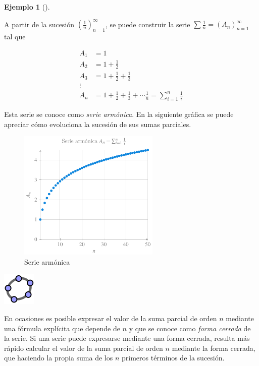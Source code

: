 \documentclass[
  a4paper,
]{scrreport}
\theoremstyle{definition}
\newtheorem{example}{Ejemplo}[chapter]
\theoremstyle{plain}
\theoremstyle{definition}
\theoremstyle{definition}
\theoremstyle{plain}
\theoremstyle{plain}
\theoremstyle{remark}
\begin{document}
\begin{example}[]\protect\hypertarget{exm-serie}{}\label{exm-serie}

A partir de la sucesión \(\left(\frac{1}{n}\right)_{n=1}^\infty\), se
puede construir la serie \(\sum \frac{1}{n}=(A_n)_{n=1}^\infty\) tal que

\begin{align*}
A_1 &= 1\\ 
A_2 &= 1+\frac{1}{2}\\ 
A_3 &= 1+\frac{1}{2}+\frac{1}{3}\\ 
\vdots\\ 
A_n &= 1+\frac{1}{2}+\frac{1}{3}+\cdots \frac{1}{n} = \sum_{i=1}^n\frac{1}{i} 
\end{align*}

Esta serie se conoce como \emph{serie armónica}. En la siguiente gráfica
se puede apreciar cómo evoluciona la sucesión de sus sumas parciales.

\begin{figure}[H]

{\centering \includegraphics[width=0.6\textwidth,height=\textheight]{img/series/serie-armonica.pdf}

}

\caption{Serie armónica}

\end{figure}%

\includegraphics{img/logos/logo-geogebra.png}

\end{example}

En ocasiones es posible expresar el valor de la suma parcial de orden
\(n\) mediante una fórmula explícita que depende de \(n\) y que se
conoce como \emph{forma cerrada} de la serie. Si una serie puede
expresarse mediante una forma cerrada, resulta más rápido calcular el
valor de la suma parcial de orden \(n\) mediante la forma cerrada, que
haciendo la propia suma de los \(n\) primeros términos de la sucesión.
\end{document}
